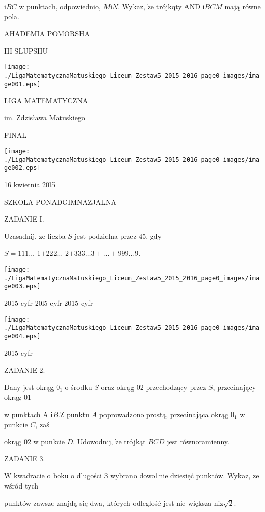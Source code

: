 \documentclass[a4paper,12pt]{article}
\begin{document}
$\mathrm{i}BC$ w punktach, odpowiednio, $M\mathrm{i}N$. Wykaz, $\dot{\mathrm{z}}\mathrm{e}$ trójkqty AND $\mathrm{i}BCM$ mają równe pola.






AHADEMIA POMORSHA

III SLUPSHU
\begin{center}
\texttt{[image: ./LigaMatematycznaMatuskiego\_Liceum\_Zestaw5\_2015\_2016\_page0\_images/image001.eps]}
\end{center}
LIGA MATEMATYCZNA

im. Zdzisława Matuskiego

FINAL
\begin{center}
\texttt{[image: ./LigaMatematycznaMatuskiego\_Liceum\_Zestaw5\_2015\_2016\_page0\_images/image002.eps]}
\end{center}
16 kwietnia 20l5

SZKOLA PONADGIMNAZJALNA

ZADANIE I.

Uzasadnij, $\dot{\mathrm{z}}\mathrm{e}$ liczba $S$ jest podzielna przez 45, gdy

$ S=111\ldots$ 1$+$222$\ldots$ 2$+$333$\ldots 3+\ldots+999\ldots 9.$
\begin{center}
\texttt{[image: ./LigaMatematycznaMatuskiego\_Liceum\_Zestaw5\_2015\_2016\_page0\_images/image003.eps]}
\end{center}
2015 cyfr 20l5 cyfr  2015 cyfr
\begin{center}
\texttt{[image: ./LigaMatematycznaMatuskiego\_Liceum\_Zestaw5\_2015\_2016\_page0\_images/image004.eps]}
\end{center}
2015 cyfr

ZADANIE 2.

Dany jest okrąg $0_{1}$ o środku $S$ oraz okrąg 02 przechodzący przez $S$, przecinający okrąg 01

w punktach A $\mathrm{i}B. \mathrm{Z}$ punktu $A$ poprowadzono prostą, przecinająca okrąg $0_{1}$ w punkcie $C$, zaś

okrąg 02 w punkcie $D$. Udowodnij, $\dot{\mathrm{z}}\mathrm{e}$ trójkąt $BCD$ jest równoramienny.

ZADANIE 3.

$\mathrm{W}$ kwadracie o boku o dlugości 3 wybrano dowo1nie dziesięć punktów. Wykaz, $\dot{\mathrm{z}}\mathrm{e}$ wśród tych

punktów zawsze znajdą się dwa, których odleglość jest nie większa $\mathrm{n}\mathrm{i}\dot{\mathrm{z}}\sqrt{2}.$
\end{document}
